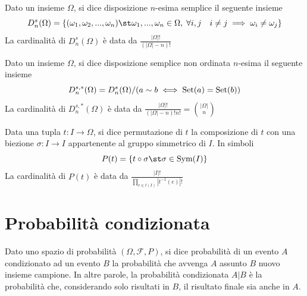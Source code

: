         \begin{definition}
            Dato un insieme $\Omega$, si dice disposizione $n$-esima semplice il seguente insieme
            \[
                D^{s}_{n}(\Omega) = \left\{ (\omega_{1}, \omega_{2}, ..., \omega_{n}) \st \omega_{1}, ..., \omega_{n} \in \Omega, \; \forall i, j \quad i \neq j \implies \omega_{i} \neq \omega_{j} \right\}
            \]
            La cardinalità di $D^{s}_{n}(\Omega)$ è data da $\displaystyle \frac{|\Omega|!}{(|\Omega| - n)!}$
        \end{definition}

        \begin{definition}
            Dato un insieme $\Omega$, si dice disposizione semplice non ordinata $n$-esima il seguente insieme
            \[
                D^{s, *}_{n}(\Omega) = D^{s}_{n}(\Omega) / (a \sim b \iff \textnormal{Set}(a) = \textnormal{Set}(b))
            \]
            La cardinalità di $D^{s, *}_{n}(\Omega)$ è data da $\displaystyle \frac{|\Omega|!}{(|\Omega| - n)!n!} = \binom{|\Omega|}{n}$
        \end{definition}

        \begin{definition}[Permutazione]
            Data una tupla $t: I \rightarrow \Omega$, si dice permutazione di $t$ la composizione di $t$ con una biezione $\sigma: I \rightarrow I$ appartenente al gruppo simmetrico di $I$.
            In simboli
            \[
                P(t) = \{ t \circ \sigma \st \sigma \in \textnormal{Sym}(I)\}
            \]
            La cardinalità di $P(t)$ è data da $\displaystyle \frac{|I|!}{\prod_{e \in t(I)} |t^{-1}(e)|!}$
        \end{definition}



    \section{Probabilità condizionata}
        Dato uno spazio di probabilità $(\Omega, \mathcal{F}, P)$, si dice probabilità di un evento $A$ condizionato ad un evento $B$ la probabilità che avvenga $A$ assunto $B$ nuovo insieme campione.
        In altre parole, la probabilità condizionata $A | B$ è la probabilità che, considerando solo risultati in $B$, il risultato finale sia anche in $A$.

